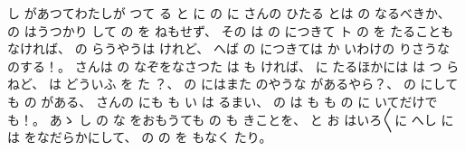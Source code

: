 し
があつてわたしが
つて
る
と
に
の
に
さんの
ひたる
とは
の
なるべきか、
%
の
はうつかり
して
の
を
ねもせず、
%
その
は
の
につきて
ト
の
を
たることもなければ、
%
の
らうやうは
けれど、
%
へば
の
につきては
か
いわけの
りさうな
のする！。
%
さんは
の
なぞをなさつた
は
も
ければ、
%
に
たるほかには
は
つ
らねど、
%
は
どういふ
を
た
？、
%
の
にはまた
のやうな
があるやら？、
%
の
にしても
の
がある、
%
さんの
にも
も
い
は
るまい、
%
の
は
も
も
の
に
いてだけでも！。
%
あゝ
し
の
な
をおもうても
の
も
きことを、
%
と
お
はいろ〳〵に
へし
には
をなだらかにして、
%
の
の
を
もなく
たり。
